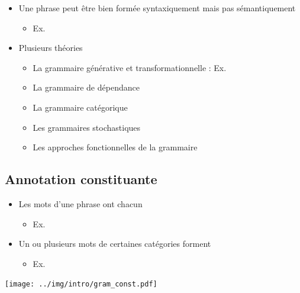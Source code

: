 \documentclass{KodeBook}
\begin{document}
\begin{itemize}
	\item Une phrase peut être bien formée syntaxiquement mais pas sémantiquement 
	\begin{itemize}
		\item Ex. 
	\end{itemize}
	\item Plusieurs théories 
	\begin{itemize}
		\item La grammaire générative et transformationnelle : Ex. 
		\item La grammaire de dépendance 
		\item La grammaire catégorique
		\item Les grammaires stochastiques
		\item Les approches fonctionnelles de la grammaire
	\end{itemize}
	
\end{itemize}

\subsection{Annotation constituante}

\begin{itemize}
	\item Les mots d'une phrase ont chacun 
	\begin{itemize}
		\item Ex. 
	\end{itemize}
	\item Un ou plusieurs mots de certaines catégories forment 
	\begin{itemize}
		\item Ex. 
	\end{itemize}
\end{itemize}

\begin{center}
	\texttt{[image: ../img/intro/gram\_const.pdf]}
\end{center}
\end{document}
